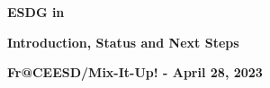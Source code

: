 \documentclass{beamer}
\begin{document}

\begin{frame}\frametitle{}
\vspace*{0.2in}
\centerline{\textrm{{\huge\bfseries\color{myOrange}ESDG in \mirgecom{}}}}
\smallskip
\smallskip
\centerline{\textrm{{\small\bfseries\color{myOrange}Introduction, Status and Next Steps}}}
\bigskip
\centerline{\textrm{{\large\bfseries{Fr@CEESD/Mix-It-Up! - April 28, 2023}}}}
\vspace*{0.2in}
\begin{center}
\vspace*{0.4in}
\end{center}
\end{frame}


\end{document}
